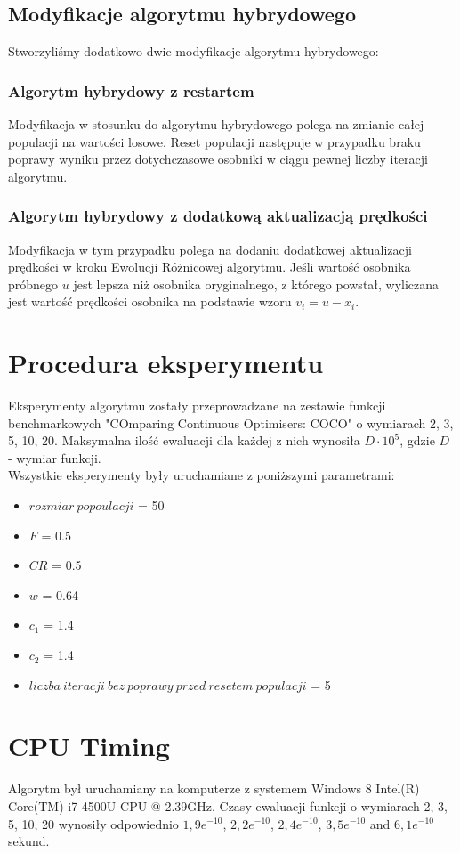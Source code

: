 \documentclass{article}
\begin{document}
\subsection{Modyfikacje algorytmu hybrydowego}
Stworzyliśmy dodatkowo dwie modyfikacje algorytmu hybrydowego:
\subsubsection{Algorytm hybrydowy z restartem}
Modyfikacja w stosunku do algorytmu hybrydowego polega na zmianie całej populacji na wartości losowe. Reset populacji następuje w przypadku braku poprawy wyniku przez dotychczasowe osobniki w ciągu pewnej liczby iteracji algorytmu.
\subsubsection{Algorytm hybrydowy z dodatkową aktualizacją prędkości}
Modyfikacja w tym przypadku polega na dodaniu dodatkowej aktualizacji prędkości w kroku Ewolucji Różnicowej algorytmu. Jeśli wartość osobnika próbnego $u$ jest lepsza niż osobnika oryginalnego, z którego powstał, wyliczana jest wartość prędkości osobnika na podstawie wzoru $v_i=u - x_i$.
 \section{Procedura eksperymentu}
Eksperymenty algorytmu zostały przeprowadzane na zestawie funkcji benchmarkowych "COmparing Continuous Optimisers: COCO" o wymiarach 2, 3, 5, 10, 20. Maksymalna ilość ewaluacji dla każdej z nich wynosiła $D \cdot 10^5$, gdzie $D$ - wymiar funkcji.\\
Wszystkie eksperymenty były uruchamiane z poniższymi parametrami:
\begin{itemize}
\item $rozmiar\ popoulacji$ = 50
\item $F$ = 0.5
\item $CR$ = 0.5
\item $w$ = 0.64
\item $c_1$ = 1.4
\item $c_2$ = 1.4
\item $liczba\ iteracji\ bez\ poprawy\ przed\ resetem\ populacji$ = 5
\end{itemize}

 \section{CPU Timing}
Algorytm był uruchamiany na komputerze z systemem Windows 8 Intel(R) Core(TM) i7-4500U CPU @ 2.39GHz. Czasy ewaluacji funkcji o wymiarach 2, 3, 5, 10, 20 wynosiły odpowiednio $1,9e^{-10}$, $2,2e^{-10}$, $2,4e^{-10}$, $3,5e^{-10}$ and $6,1e^{-10}$ sekund. 
\end{document}
